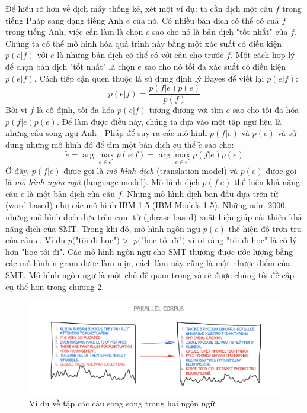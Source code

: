 Để hiểu rõ hơn về dịch máy thống kê, xét một ví dụ: ta cần dịch một câu $f$ trong tiếng Pháp sang dạng tiếng Anh $e$ của nó. Có nhiều bản dịch có thể có cuả $f$ trong tiếng Anh, việc cần làm là chọn $e$ sao cho nó là bản dịch "tốt nhất" của $f$. Chúng ta có thể mô hình hóa quá trình này bằng một xác suất có điều kiện $p(e|f)$ với $e$ là những bản dịch có thể có với câu cho trước $f$. Một cách hợp lý để chọn bản dịch "tốt nhất" là chọn $e$ sao cho nó tối đa xác suất có điều kiện $p(e|f)$. Cách tiếp cận quen thuộc là sử dụng định lý Bayes để viết lại $p(e|f)$:
\begin{equation} \label{bayesFomular}
	p(e|f) = \frac{p(f|e)p(e)}{p(f)}
\end{equation}
Bởi vì $f$ là cố định, tối đa hóa $p(e|f)$ tương đương với tìm $e$ sao cho tối đa hóa $p(f|e)p(e)$. Để làm được điều này, chúng ta dựa vào một tập ngữ liệu là những câu song ngữ Anh - Pháp để suy ra các mô hình $p(f|e)$ và $p(e)$ và sử dụng những mô hình đó để tìm một bản dịch cụ thể $\tilde{e}$ sao cho:
\begin{equation} \label{ehatSMT}
	\tilde{e} = \arg\max_{e \in e^*} p(e|f) = \arg\max_{e \in e^*} p(f|e)p(e)
\end{equation}
Ở đây, $p(f|e)$ được gọi là \textit{mô hình dịch} (translation model) và $p(e)$ được gọi là \textit{mô hình ngôn ngữ} (language model). Mô hình dịch $p(f|e)$ thể hiện khả năng câu $e$ là một bản dịch của câu $f$. Những mô hình dịch ban đầu dựa trên từ (word-based) như các mô hình IBM 1-5 (IBM Models 1-5). Những năm 2000, những mô hình dịch dựa trên cụm từ (phrase based) xuất hiện giúp cải thiện khả năng dịch của SMT. Trong khi đó, mô hình ngôn ngữ $p(e)$ thể hiện độ trơn tru của câu $e$. Ví dụ $p($"tôi đi học"$) >$ $p($"học tôi đi"$)$ vì rõ ràng "tôi đi học" là có lý hơn "học tôi đi". Các mô hình ngôn ngữ cho SMT thường được ước lượng bằng các mô hình n-gram được làm mịn, cách làm này cũng là một nhược điểm của SMT. Mô hình ngôn ngữ là một chủ đề quan trọng và sẽ được chúng tôi đề cập cụ thể hơn trong chương 2.

\begin{figure}
	\centering
	\includegraphics[width=\textwidth]{smt}
	\caption[Ví dụ về tập các câu song song trong hai ngôn ngữ]{Ví dụ về tập các câu song song trong hai ngôn ngữ}
	\label{fig_parallelcorpus}
\end{figure}

